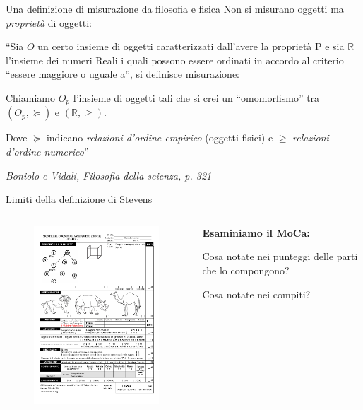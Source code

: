 \documentclass[
  ignorenonframetext,
]{beamer}
\begin{document}
\begin{frame}{Una definizione di misurazione da filosofia e fisica}
\label{una-definizione-di-misurazione-da-filosofia-e-fisica}
Non si misurano oggetti ma \emph{proprietà} di oggetti:

``Sia \(O\) un certo insieme di oggetti caratterizzati dall'avere la
proprietà P e sia \(\mathbb{R}\) l'insieme dei numeri Reali i quali
possono essere ordinati in accordo al criterio ``essere maggiore o
uguale a'', si definisce misurazione:

Chiamiamo \(O_p\) l'insieme di oggetti tali che si crei un
``omomorfismo'' tra \((O_p, \succcurlyeq)\) e \((\mathbb{R}, \geq)\).

Dove \(\succcurlyeq\) indicano \emph{relazioni d’ordine empirico}
(oggetti fisici) e \(\geq\) \emph{relazioni d’ordine numerico}''

\begin{flushright}
\emph{Boniolo e Vidali, Filosofia della scienza, p. 321}
\end{flushright}
\end{frame}

\begin{frame}{Limiti della definizione di Stevens}
\label{limiti-della-definizione-di-stevens}
\begin{columns}
  \begin{column}{0.5\textwidth}
    \begin{figure}
    \includegraphics[scale=0.5]{Figures/MOCA.png}
    \end{figure}
  \end{column}
  \begin{column}{0.5\textwidth}
    \textbf{Esaminiamo il MoCa:}
    \pause
    \vspace{2em}
    
    Cosa notate nei punteggi delle parti che lo compongono?
    
    \vspace{2em}
    Cosa notate nei compiti?
  \end{column}
\end{columns}
\end{frame}
\end{document}
